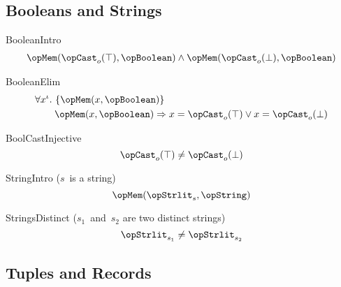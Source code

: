 \documentclass[11pt, a4paper, oneside]{article}
\begin{document}
    \subsection{Booleans and Strings}
    \label{subsec:bools_and_strings}

\begin{axioms}
\item[BooleanIntro] \[
        \begin{aligned}
            \opMem(\opCast_o(\top), \opBoolean) \wedge \opMem(\opCast_o(\bot), \opBoolean)
        \end{aligned}
    \]

\item[BooleanElim] \[
        \begin{aligned}
            &\forall x^\idv.\, \st{ \opMem(x, \opBoolean) } \\
            &\qquad \opMem(x, \opBoolean) \imp x = \opCast_o(\top) \vee x = \opCast_o(\bot)
        \end{aligned}
    \]

\item[BoolCastInjective] \[
        \opCast_o(\top) \neq \opCast_o(\bot)
    \]

\item[StringIntro ({\rm$s$~is a string})] \[
        \opMem(\opStrlit_s, \opString)
    \]

\item[StringsDistinct ({\rm$s_1$~and~$s_2$ are two distinct strings})] \[
        \opStrlit_{s_1} \neq \opStrlit_{s_2}
    \]

\end{axioms}


    \subsection{Tuples and Records}
    \label{subsec:tups_and_recs}
\end{document}
